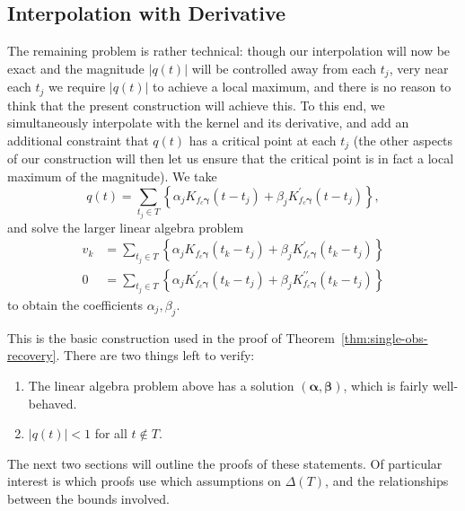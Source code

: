\documentclass[11pt]{article}
\begin{document}
\subsection{Interpolation with Derivative}

The remaining problem is rather technical: though our interpolation will now be exact and the magnitude $|q(t)|$ will be controlled away from each $t_j$, very near each $t_j$ we require $|q(t)|$ to achieve a local maximum, and there is no reason to think that the present construction will achieve this.
To this end, we simultaneously interpolate with the kernel and its derivative, and add an additional constraint that $q(t)$ has a critical point at each $t_j$ (the other aspects of our construction will then let us ensure that the critical point is in fact a local maximum of the magnitude).
We take
\[ q(t) = \sum_{t_j \in T} \left\{ \alpha_j K_{f_c \bm \gamma}(t - t_j) + \beta_j K_{f_c \bm \gamma}^\prime(t - t_j)\right\}, \]
and solve the larger linear algebra problem
\begin{align*}
  v_k &= \sum_{t_j \in T} \left\{ \alpha_j K_{f_c \bm \gamma}(t_k - t_j) + \beta_j K_{f_c \bm \gamma}^\prime(t_k - t_j)\right\} \\
  0 &= \sum_{t_j \in T} \left\{ \alpha_j K_{f_c \bm \gamma}^{\prime}(t_k - t_j) + \beta_j K_{f_c \bm \gamma}^{\prime\prime}(t_k - t_j)\right\}
\end{align*}
to obtain the coefficients $\alpha_j, \beta_j$.

This is the basic construction used in the proof of Theorem~\ref{thm:single-obs-recovery}.
There are two things left to verify:
\begin{enumerate}
\item The linear algebra problem above has a solution $(\bm \alpha, \bm\beta)$, which is fairly well-behaved.
\item $|q(t)| < 1$ for all $t \notin T$.
\end{enumerate}
The next two sections will outline the proofs of these statements.
Of particular interest is which proofs use which assumptions on $\Delta(T)$, and the relationships between the bounds involved.
\end{document}
